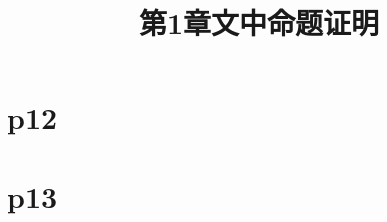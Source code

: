 \documentclass{article}
\theoremstyle{mystyle}
\theoremstyle{zproofstyle}
\begin{document}
\title{第1章文中命题证明}
\maketitle
\section*{p12}
\section*{p13}
\end{document}

